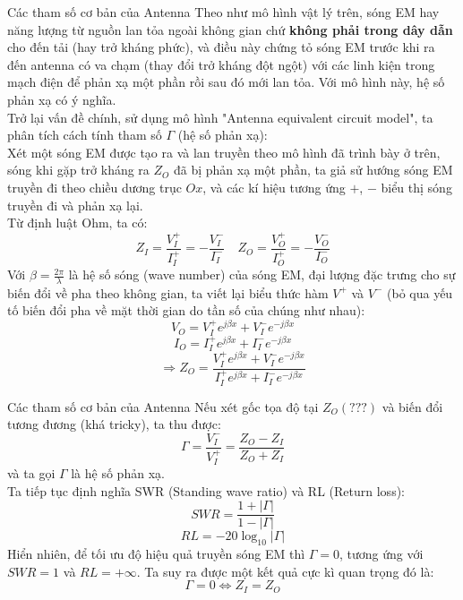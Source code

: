 \documentclass[8pt]{beamer}
\begin{document}
\begin{frame}{Các tham số cơ bản của Antenna}
	Theo như mô hình vật lý trên, sóng EM hay năng lượng từ nguồn lan tỏa ngoài không gian chứ \textbf{không phải trong dây dẫn} cho đến tải (hay trở kháng phức), và điều này chứng tỏ sóng EM trước khi ra đến antenna có va chạm (thay đổi trở kháng đột ngột) với các linh kiện trong mạch điện để phản xạ một phần rồi sau đó mới lan tỏa. Với mô hình này, \alert{hệ số phản xạ có ý nghĩa}.
\\Trở lại vấn đề chính, sử dụng mô hình "Antenna equivalent circuit model", ta phân tích cách tính tham số $\Gamma$ (hệ số phản xạ):
\\ Xét một sóng EM được tạo ra và lan truyền theo mô hình đã trình bày ở trên, sóng khi gặp trở kháng ra $Z_{O}$ đã bị phản xạ một phần, ta giả sử hướng sóng EM truyền đi theo chiều dương trục $Ox$, và các kí hiệu tương ứng $+$, $-$ biểu thị sóng truyền đi và phản xạ lại.
\\ Từ định luật Ohm, ta có:
$$Z_{I}=\frac{V_{I}^+}{I_{I}^+}=-\frac{V^-_{I}}{I^-_{I}}\quad Z_{O}=\frac{V^+_{O}}{I^+_{O}}=-\frac{V^-_{O}}{I^-_{O}}$$
Với $\beta=\frac{2\pi}{\lambda}$ là hệ số sóng (wave number) của sóng EM, đại lượng đặc trưng cho sự biến đổi về pha theo không gian, ta viết lại biểu thức hàm $V^+$ và $V^-$ (bỏ qua yếu tố biến đổi pha về mặt thời gian do tần số của chúng như nhau):
$$V_{O}=V_{I}^+ e^{j\beta x}+V_{I}^- e^{-j\beta x}$$
$$I_{O}=I_{I}^+ e^{j\beta x}+I_{I}^- e^{-j\beta x}$$
$$\Rightarrow Z_{O}=\frac{V_{I}^+ e^{j\beta x}+V_{I}^- e^{-j\beta x}}{I_{I}^+ e^{j\beta x}+I_{I}^- e^{-j\beta x}}$$
\end{frame}
\begin{frame}{Các tham số cơ bản của Antenna}
Nếu xét gốc tọa độ tại $Z_{O} (???)$ và biến đổi tương đương (khá tricky), ta thu được:
$$\Gamma=\frac{V_{I}^-}{V_{I}^+}=\frac{Z_{O}-Z_{I}}{Z_{O}+Z_{I}}$$
và ta gọi $\Gamma$ là \alert{hệ số phản xạ}.
\\Ta tiếp tục định nghĩa SWR (Standing wave ratio) và RL (Return loss):
$$SWR=\frac{1+|\Gamma|}{1-|\Gamma|}$$
$$RL=-20\log_{10}|\Gamma|$$
Hiển nhiên, để tối ưu độ hiệu quả truyền sóng EM thì $\Gamma=0$, tương ứng với $SWR=1$ và $RL=+\infty$. Ta suy ra được một kết quả cực kì quan trọng đó là:
$$\Gamma=0\Leftrightarrow Z_{I}=Z_{O}$$
\end{frame}
\end{document}
